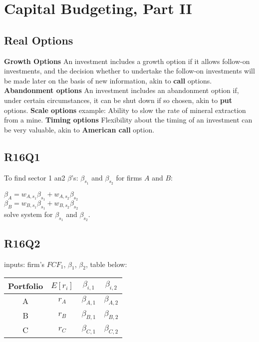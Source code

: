 \section{Capital Budgeting, Part II}

\subsection{Real Options}

{\bf Growth Options}  An investment includes a growth option if it allows follow-on investments,
and the decision whether to undertake the follow-on investments will be
made later on the basis of new information, akin to {\bf call} options. \\
{\bf Abandonment options} An investment includes an abandonment option if, under
certain circumstances, it can be shut down if so chosen, akin to {\bf put} options.
{\bf Scale options } example: Ability to slow the rate of mineral extraction from a mine.
{\bf Timing options} Flexibility about the timing of an investment can
be very valuable, akin to {\bf American call} option.


\subsection*{R16Q1}
To find sector 1 an2 $\beta$'s: $\beta_{s_1}$ and $\beta_{s_2}$ for firms $A$ and $B$:

$\beta_{A} = w_{A,s_1} \beta_{s_1} +  w_{A,s_2}  \beta_{s_2}  $ \\
$\beta_{B} = w_{B,s_1} \beta_{s_1} +  w_{B,s_2}  \beta_{s_2}  $ \\

solve system for  $\beta_{s_1}$ and $\beta_{s_2}$.

\subsection*{R16Q2}

inputs: firm's $FCF_1$,  $\beta_1$, $\beta_2$, table below:
\begin{center}
	\begin{tabular}{ |c|c|c|c| } 
		\hline
		Portfolio & $E[r_i]$ & $\beta_{i,1}$ & $\beta_{i,2}$ \\ 
		\hline
		A & $r_A$ & $\beta_{A,1}$ &  $\beta_{A,2}$ \\ 
		B & $r_B$ & $\beta_{B,1}$ &  $\beta_{B,2}$ \\ 
		C & $r_C$ & $\beta_{C,1}$ &  $\beta_{C,2}$ \\ 
		\hline
	\end{tabular}
\end{center}

